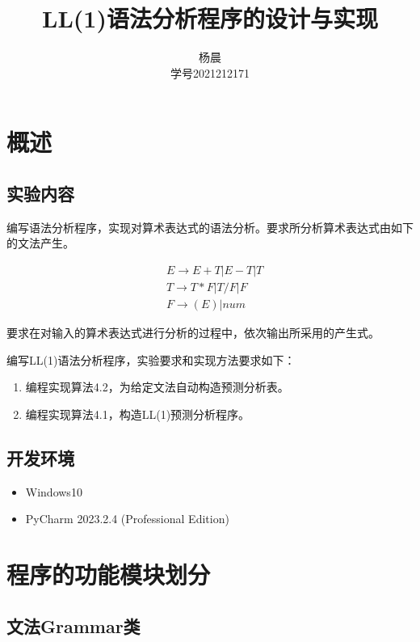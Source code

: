 \documentclass[lang=cn,11pt,a4paper]{elegantpaper}
\title{LL(1)语法分析程序的设计与实现}
\author{杨晨 \\学号2021212171}
\institute{北京邮电大学 计算机学院}
\date{\zhtoday}
\begin{document}
\maketitle

\section{概述}

\subsection{实验内容}

编写语法分析程序，实现对算术表达式的语法分析。要求所分析算术表达式由如下的文法产生。

\label{grammar}
$$
\begin{aligned}
& E\rightarrow E+T | E-T | T \\
& T\rightarrow T*F | T/F | F \\
& F\rightarrow (E) | num
\end{aligned}
$$

要求在对输入的算术表达式进行分析的过程中，依次输出所采用的产生式。

编写LL(1)语法分析程序，实验要求和实现方法要求如下：

\begin{enumerate}
    \item 编程实现算法4.2，为给定文法自动构造预测分析表。
    \item 编程实现算法4.1，构造LL(1)预测分析程序。
\end{enumerate}

    
\subsection{开发环境}

\begin{itemize}
    \item Windows10
    \item PyCharm 2023.2.4 (Professional Edition)
\end{itemize}

\section{程序的功能模块划分}

\subsection{文法Grammar类}
\end{document}
